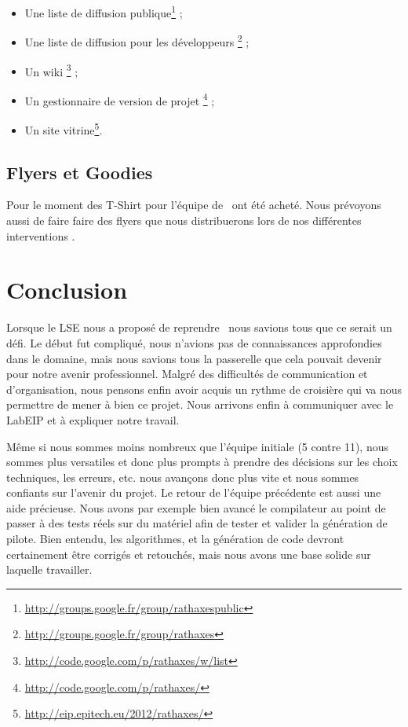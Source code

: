 \documentclass[francais]{rtxreport}
\begin{document}
\begin{itemize}
\item Une liste de diffusion publique\footnote{\url{http://groups.google.fr/group/rathaxespublic}} ;
\item Une liste de diffusion pour les développeurs \footnote{\url{http://groups.google.fr/group/rathaxes}} ;
\item Un wiki \footnote{\url{http://code.google.com/p/rathaxes/w/list}} ;
\item Un gestionnaire de version de projet \footnote{\url{http://code.google.com/p/rathaxes/}} ;
\item Un site vitrine\footnote{\url{http://eip.epitech.eu/2012/rathaxes/}}.
\end{itemize}


\section{Flyers et Goodies}

Pour le moment des T-Shirt pour l'équipe de \rtx\ ont été acheté. Nous prévoyons
aussi de faire faire des flyers que nous distribuerons lors de nos différentes
interventions .

\chapter{Conclusion}


Lorsque le LSE nous a proposé de reprendre \rtx\ nous savions tous que ce
serait un défi. Le début fut compliqué, nous n’avions pas de connaissances
approfondies dans le domaine, mais nous savions tous la passerelle que cela
pouvait devenir pour notre avenir professionnel. Malgré des difficultés de
communication et d’organisation, nous pensons enfin avoir acquis un rythme de
croisière qui va nous permettre de mener à bien ce projet. Nous arrivons enfin
à communiquer avec le LabEIP et à expliquer notre travail.

Même si nous sommes moins nombreux que l’équipe initiale (5 contre 11), nous
sommes plus versatiles et donc plus prompts à prendre des décisions sur les
choix techniques, les erreurs, etc. nous avançons donc plus vite et nous sommes
confiants sur l’avenir du projet. Le retour de l'équipe précédente est aussi
une aide précieuse.  Nous avons par exemple bien avancé le compilateur au point
de passer à des tests réels sur du matériel afin de tester et valider la
génération de pilote.  Bien entendu, les algorithmes, et la génération de code
devront certainement être corrigés et retouchés, mais nous avons une base
solide sur laquelle travailler.
\end{document}

